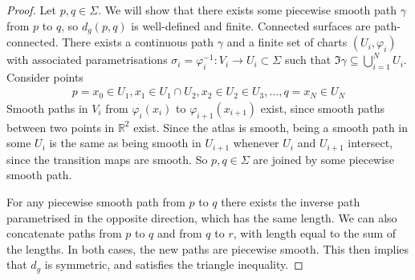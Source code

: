 \begin{proof}
	Let $p, q \in \Sigma$.
	We will show that there exists some piecewise smooth path $\gamma$ from $p$ to $q$, so $d_g(p,q)$ is well-defined and finite.
	Connected surfaces are path-connected.
	There exists a continuous path $\gamma$ and a finite set of charts $(U_i, \varphi_i)$ with associated parametrisations $\sigma_i = \varphi_i^{-1} \colon V_i \to U_i \subset \Sigma$ such that $\Im \gamma \subseteq \bigcup_{i=1}^N U_i$.
	Consider points
	\begin{align*}
		p = x_0 \in U_1, x_1 \in U_1 \cap U_2, x_2 \in U_2 \in U_3, \dots, q = x_N \in U_N
	\end{align*}
	Smooth paths in $V_i$ from $\varphi_i(x_i)$ to $\varphi_{i+1}(x_{i+1})$ exist, since smooth paths between two points in $\mathbb R^2$ exist.
	Since the atlas is smooth, being a smooth path in some $U_i$ is the same as being smooth in $U_{i+1}$ whenever $U_i$ and $U_{i+1}$ intersect, since the transition maps are smooth.
	So $p,q \in \Sigma$ are joined by some piecewise smooth path.

	For any piecewise smooth path from $p$ to $q$ there exists the inverse path parametrised in the opposite direction, which has the same length.
	We can also concatenate paths from $p$ to $q$ and from $q$ to $r$, with length equal to the sum of the lengths.
	In both cases, the new paths are piecewise smooth.
	This then implies that $d_g$ is symmetric, and satisfies the triangle inequality.


\end{proof}

